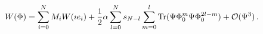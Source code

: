 \begin{equation}
W(\Phi )=\sum_{i=0}^{N}M_{i}W(\imath e_{i})+\frac{1}{2}\alpha
\sum_{l=0}^{N}s_{N-l}\sum_{m=0}^{l}{\rm Tr}(\Psi \Phi _{0}^{m}\Psi \Phi
_{0}^{2l-m})+{\cal O}(\Psi ^{3})\,.
\end{equation}

